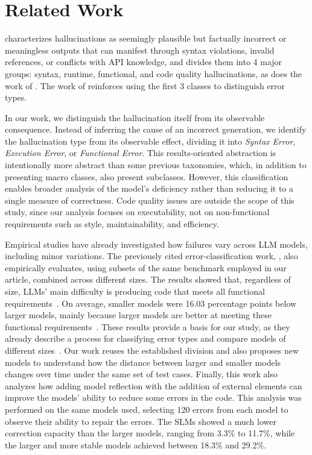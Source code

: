 \section{Related Work}

\citet{pavel2025hallucination} characterizes hallucinations as seemingly plausible but factually incorrect or meaningless outputs that can manifest through syntax violations, invalid references, or conflicts with API knowledge, and divides them into 4 major groups: syntax, runtime, functional, and code quality hallucinations, as does the work of \citet{lee2025hallucination}. The work of \citet{dou2025whatswrong} reinforces using the first 3 classes to distinguish error types.

In our work, we distinguish the hallucination itself from its observable consequence. Instead of inferring the cause of an incorrect generation, we identify the hallucination type from its observable effect, dividing it into \emph{Syntax Error}, \emph{Execution Error}, or \emph{Functional Error}. This results-oriented abstraction is intentionally more abstract than some previous taxonomies, which, in addition to presenting macro classes, also present subclasses. However, this classification enables broader analysis of the model's deficiency rather than reducing it to a single measure of correctness. Code quality issues are outside the scope of this study, since our analysis focuses on executability, not on non-functional requirements such as style, maintainability, and efficiency.

Empirical studies have already investigated how failures vary across LLM models, including minor variations. The previously cited error-classification work, \citet{dou2025whatswrong}, also empirically evaluates, using subsets of the same benchmark employed in our article, combined across different sizes. The results showed that, regardless of size, LLMs' main difficulty is producing code that meets all functional requirements~\citep{dou2025whatswrong}. On average, smaller models were 16.03 percentage points below larger models, mainly because larger models are better at meeting these functional requirements~\citep{dou2025whatswrong}. These results provide a basis for our study, as they already describe a process for classifying error types and compare models of different sizes~\citep{dou2025whatswrong}. Our work reuses the established division and also proposes new models to understand how the distance between larger and smaller models changes over time under the same set of test cases. Finally, this work also analyzes how adding model reflection with the addition of external elements can improve the models' ability to reduce some errors in the code. This analysis was performed on the same models used, selecting 120 errors from each model to observe their ability to repair the errors. The SLMs showed a much lower correction capacity than the larger models, ranging from 3.3\% to 11.7\%, while the larger and more stable models achieved between 18.3\% and 29.2\%.

